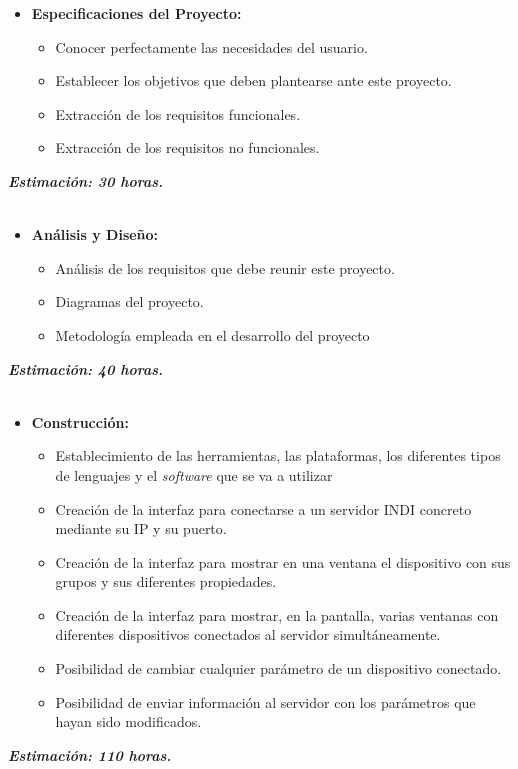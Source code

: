 \begin{itemize}
  \item \textbf{Especificaciones del Proyecto:}
  \begin{itemize}
    \item Conocer perfectamente las necesidades del usuario.
    \item Establecer los objetivos que deben plantearse ante este proyecto.
    \item Extracción de los requisitos funcionales.
    \item Extracción de los requisitos no funcionales.
  \end{itemize}
\end{itemize}
\textit{\textbf{Estimación: 30 horas.}}\\ \\

\begin{itemize}
  \item \textbf{Análisis y Diseño:}
  \begin{itemize}
    \item Análisis de los requisitos que debe reunir este proyecto.
    \item Diagramas del proyecto.
    \item Metodología empleada en el desarrollo del proyecto
  \end{itemize}
\end{itemize}
\textit{\textbf{Estimación: 40 horas.}}\\ \\

\begin{itemize}
  \item \textbf{Construcción:}
  \begin{itemize}
    \item Establecimiento de las herramientas, las plataformas, los diferentes tipos de lenguajes y el \textit{software} que se va a utilizar
    \item Creación de la interfaz para conectarse a un servidor INDI concreto mediante su IP y su puerto.
    \item Creación de la interfaz para mostrar en una ventana el dispositivo con sus grupos y sus diferentes propiedades.
    \item Creación de la interfaz para mostrar, en la pantalla, varias ventanas con diferentes dispositivos conectados al servidor simultáneamente.
    \item Posibilidad de cambiar cualquier parámetro de un dispositivo conectado.
    \item Posibilidad de enviar información al servidor con los parámetros que hayan sido modificados.
  \end{itemize}
\end{itemize}
\textit{\textbf{Estimación: 110 horas.}}\\ \\

